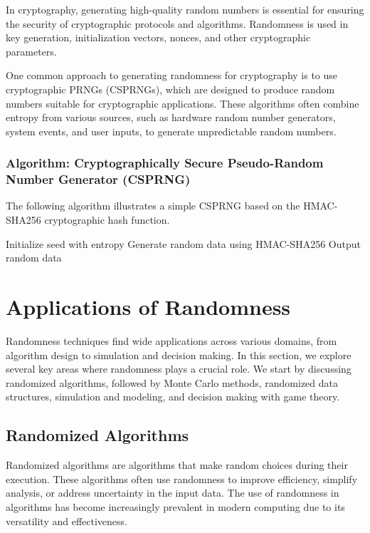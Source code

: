 \documentclass[12pt]{book} %
\begin{document}
In cryptography, generating high-quality random numbers is essential for ensuring the security of cryptographic protocols and algorithms. Randomness is used in key generation, initialization vectors, nonces, and other cryptographic parameters.

One common approach to generating randomness for cryptography is to use cryptographic PRNGs (CSPRNGs), which are designed to produce random numbers suitable for cryptographic applications. These algorithms often combine entropy from various sources, such as hardware random number generators, system events, and user inputs, to generate unpredictable random numbers.

\subsubsection{Algorithm: Cryptographically Secure Pseudo-Random Number Generator (CSPRNG)}

The following algorithm illustrates a simple CSPRNG based on the HMAC-SHA256 cryptographic hash function.
\FloatBarrier
\begin{algorithm}
\caption{Cryptographically Secure Pseudo-Random Number Generator (CSPRNG)}
\begin{algorithmic}
\State Initialize seed with entropy
    \State Generate random data using HMAC-SHA256
    \State Output random data
\EndWhile
\end{algorithmic}
\end{algorithm}
\FloatBarrier

\section{Applications of Randomness}

Randomness techniques find wide applications across various domains, from algorithm design to simulation and decision making. In this section, we explore several key areas where randomness plays a crucial role. We start by discussing randomized algorithms, followed by Monte Carlo methods, randomized data structures, simulation and modeling, and decision making with game theory.

\subsection{Randomized Algorithms}

Randomized algorithms are algorithms that make random choices during their execution. These algorithms often use randomness to improve efficiency, simplify analysis, or address uncertainty in the input data. The use of randomness in algorithms has become increasingly prevalent in modern computing due to its versatility and effectiveness.
\end{document}
